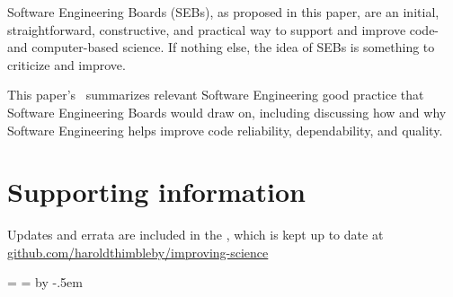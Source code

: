 \documentclass{comjnl}
\begin{document}
Software Engineering Boards (SEBs), as proposed in this paper, are an initial, straightforward, constructive, and practical way to support and improve code- and computer-based science. If nothing else, the idea of SEBs is something to criticize and improve.

This paper's \supplement\ summarizes relevant Software Engineering good practice that Software Engineering Boards would draw on, including discussing how and why Software Engineering helps improve code reliability, dependability, and quality.

\section*{Supporting information}

Updates and errata are included in the \supplement, which is kept up to date at \url{github.com/haroldthimbleby/improving-science}

\newcount\csrefcount {}
\def\csref{\global\advance\csrefcount by 1}
\long{}
\long{}

\newdimen\saveparindent \saveparindent=\parindent
\newdimen\highlightwidth \highlightwidth=\columnwidth
\advance \highlightwidth by -.5em

\long{}
\long{}

\long{}
\long{}
\long{}
\end{document}
